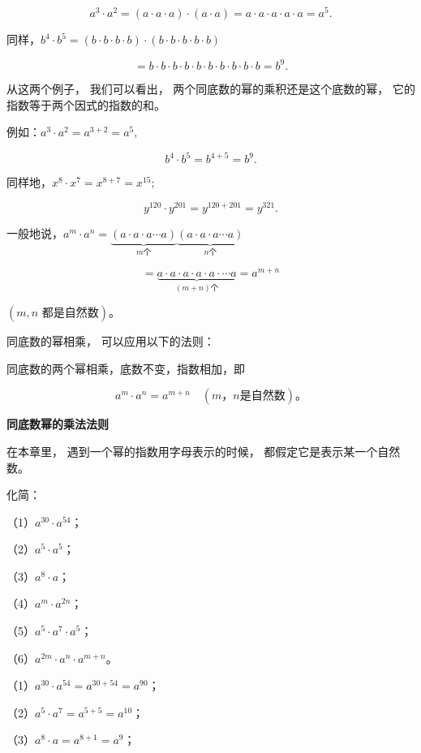 \[
a ^{3} \cdot a ^{2} = (a \cdot a \cdot a) \cdot (a \cdot a) = a \cdot a \cdot a \cdot a \cdot a = a ^{5}.
\]

同样，\(b^{4} \cdot b^{5} = (b \cdot b \cdot b \cdot b) \cdot (b \cdot b \cdot b \cdot b \cdot b)\)

\[
= b \cdot b \cdot b \cdot b \cdot b \cdot b \cdot b \cdot b \cdot b \cdot b = b ^{9}.
\]

从这两个例子， 我们可以看出， 两个同底数的幂的乘积还是这个底数的幂，
它的指数等于两个因式的指数的和。

例如：\(a^3\cdot a^2 = a^{3 + 2} = a^5,\)

\[
b ^{4} \cdot b ^{5} = b ^{4 + 5} = b ^{9}.
\]

同样地，\(x^8\cdot x^7 = x^{8 + 7} = x^{15};\)

\[
y ^{120} \cdot y ^{201} = y ^{120 + 201} = y ^{321}.
\]

一般地说，\(a^m\cdot a^n = \underbrace{(a\cdot a\cdot a\cdots a)}_{m\text{个}}\underbrace{(a\cdot a\cdot a\cdots a)}_{n\text{个}}\)

\[
= \underbrace {a \cdot a \cdot a \cdot a \cdot a \cdot \cdots a} _{(m + n) \text{个}} = a ^{m + n}
\]

\((m, n \text{ 都是自然数})\)。

同底数的幂相乘， 可以应用以下的法则：

同底数的两个幂相乘，底数不变，指数相加，即

\[
a ^{m} \cdot a ^{n} = a ^{m + n} \quad (m\text{，} n \text{是自然数})\text{。}
\]

\textbf{同底数幂的乘法法则}

 在本章里， 遇到一个幂的指数用字母表示的时候，
都假定它是表示某一个自然数。

 化简：

（1）\(a^{30} \cdot a^{54}\)；

（2）\(a^5 \cdot a^5\)；

（3）\(a^8 \cdot a\)；

（4）\(a^{m} \cdot a^{2n}\)；

（5）\(a^5 \cdot a^7 \cdot a^5\)；

（6）\(a^{2m} \cdot a^n \cdot a^{m+n}\)。

 （1）\(a^{30} \cdot a^{54} = a^{30 + 54} = a^{90}\)；

（2）\(a^5 \cdot a^7 = a^{5 + 5} = a^{10}\)；

（3）\(a^8 \cdot a = a^{8 + 1} = a^9\)；

